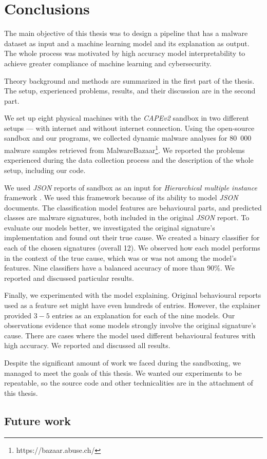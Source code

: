 \chapter{Conclusions} \label{chap:concl}
The main objective of this thesis was to design a pipeline that has a malware dataset as input and a machine learning model and its explanation as output. The whole process was motivated by high accuracy model interpretability to achieve greater compliance of machine learning and cybersecurity.

Theory background and methods are summarized in the first part of the thesis. The setup, experienced problems, results, and their discussion are in the second part.

We set up eight physical machines with the \emph{CAPEv2} sandbox in two different setups --- with internet and without internet connection. Using the open-source sandbox and our programs, we collected dynamic malware analyses for 80~000 malware samples retrieved from MalwareBazaar\footnote{https://bazaar.abuse.ch/}. We reported the problems experienced during the data collection process and the description of the whole setup, including our code.

We used \emph{JSON} reports of sandbox as an input for \emph{Hierarchical multiple instance} framework \cite{Mandlik2020}. We used this framework because of its ability to model \emph{JSON} documents. The classification model features are behavioural parts, and predicted classes are malware signatures, both included in the original \emph{JSON} report. 
To evaluate our models better, we investigated the original signature's implementation and found out their true cause. We created a binary classifier for each of the chosen signatures (overall 12). We observed how each model performs in the context of the true cause, which was or was not among the model's features. Nine classifiers have a balanced accuracy of more than 90\%. We reported and discussed particular results.

Finally, we experimented with the model explaining. Original behavioural reports used as a feature set might have even hundreds of entries. However, the explainer provided $3-5$ entries as an explanation for each of the nine models. Our observations evidence that some models strongly involve the original signature's cause. There are cases where the model used different behavioural features with high accuracy. We reported and discussed all results.

Despite the significant amount of work we faced during the sandboxing, we managed to meet the goals of this thesis. We wanted our experiments to be repeatable, so the source code and other technicalities are in the attachment of this thesis.

\section*{Future work}

